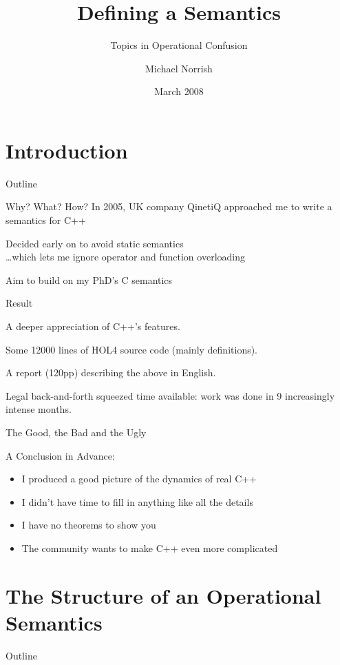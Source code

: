 \documentclass[compress,dvips,color=usenames,xcolor=dvipsnames]{beamer}
\title{Defining a \cpp{} Semantics}
\subtitle{Topics in Operational Confusion}
\author{Michael Norrish}
\institute[NICTA]{Canberra Research Lab., NICTA}
\date{March 2008}
\newcommand{\cpp}{\mbox{C\hspace{-.1em}+\hspace{-.05em}+}}
\begin{document}
\frame{\titlepage}
\section{Introduction}
\begin{frame}{Outline}\tableofcontents\end{frame}

\begin{frame}{Why? What? How?}
In 2005, UK company QinetiQ approached me to write a semantics
  for \cpp{}

\bigskip
Decided early on to avoid static semantics\\[1mm]
  \quad\quad\dots {\footnotesize which lets me ignore operator and function overloading}

\bigskip
Aim to build on my PhD's C semantics
\end{frame}

\begin{frame}{Result}

A deeper appreciation of \cpp's features.

\bigskip
Some 12\hspace{.1em}000 lines of HOL4 source code (mainly definitions).

\bigskip
A report (120pp) describing the above in English.

\bigskip
Legal back-and-forth squeezed time available: work was done in 9
increasingly intense months.

\end{frame}

\begin{frame}{The Good, the Bad and the Ugly}

A Conclusion in Advance:
\begin{itemize}
\item I produced a good picture of the dynamics of real \cpp
\item I didn't have time to fill in anything like all the details
\item I have no theorems to show you
\item The community wants to make \cpp{} even more complicated
\end{itemize}

\end{frame}

\section{The Structure of an Operational Semantics}
\begin{frame}{Outline}\tableofcontents[current]\end{frame}
\end{document}
